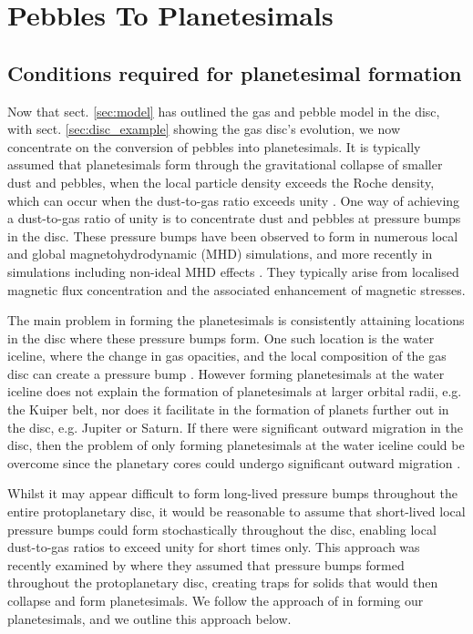 \documentclass[a4paper,fleqn,usenatbib]{mnras}
\begin{document}
\section{Pebbles To Planetesimals}
\label{sec:peb_to_pltml}
\subsection{Conditions required for planetesimal formation}
Now that sect. \ref{sec:model} has outlined the gas and pebble model in the disc, with sect. \ref{sec:disc_example} showing the gas disc's evolution, we now concentrate on the conversion of pebbles into planetesimals.
It is typically assumed that planetesimals form through the gravitational collapse of smaller dust and pebbles, when the local particle density exceeds the Roche density, which can occur when the dust-to-gas ratio exceeds unity \citep{Johansen07,JohansenYoudin2009}.
One way of achieving a dust-to-gas ratio of unity is to concentrate dust and pebbles at pressure bumps in the disc.
These pressure bumps have been observed to form in numerous local \citep{Johansen09,Simon12,Dittrich13} and global \citep{SteinackerPapaloizou2002,PapaloizouNelson2003,FromangNelson2006} magnetohydrodynamic (MHD) simulations, and more recently in simulations including non-ideal MHD effects \citep{Bai2014,ZhuStoneBai2014,BethuneLesur2016}.
They typically arise from localised magnetic flux concentration and the associated enhancement of magnetic stresses.

The main problem in forming the planetesimals is consistently attaining locations in the disc where these pressure bumps form.
One such location is the water iceline, where the change in gas opacities, and the local composition of the gas disc can create a pressure bump \citep{Drazkowska17}.
However forming planetesimals at the water iceline does not explain the formation of planetesimals at larger orbital radii, e.g. the Kuiper belt, nor does it facilitate in the formation of planets further out in the disc, e.g. Jupiter or Saturn.
If there were significant outward migration in the disc, then the problem of only forming planetesimals at the water iceline could be overcome since the planetary cores could undergo significant outward migration \citep{Paardekooper2014,McNally18}.

Whilst it may appear difficult to form long-lived pressure bumps throughout the entire protoplanetary disc, it would be reasonable to assume that short-lived local pressure bumps could form stochastically throughout the disc, enabling local dust-to-gas ratios to exceed unity for short times only.
This approach was recently examined by \citet{Lenz19} where they assumed that pressure bumps formed throughout the protoplanetary disc, creating traps for solids that would then collapse and form planetesimals.
We follow the approach of \citet{Lenz19} in forming our planetesimals, and we outline this approach below.
\end{document}
